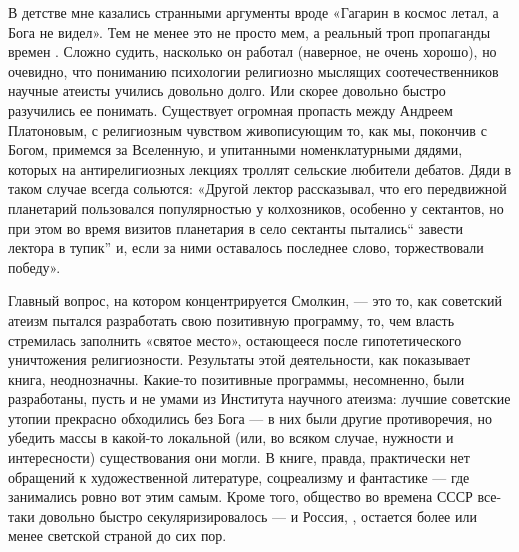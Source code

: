 В детстве мне казались странными аргументы вроде
«Гагарин в космос летал, а Бога не видел».
Тем не менее это не просто мем, а реальный троп пропаганды
времен .
Сложно судить, насколько он работал (наверное, не очень хорошо), но очевидно,
что пониманию психологии религиозно мыслящих соотечественников научные
атеисты учились довольно долго.
Или скорее довольно быстро разучились ее понимать.
Существует огромная пропасть между Андреем Платоновым,
с религиозным чувством живописующим то, как мы,
покончив с Богом, примемся за Вселенную, и упитанными номенклатурными дядями,
которых на антирелигиозных лекциях троллят сельские любители дебатов.
Дяди в таком случае всегда сольются:
«Другой лектор рассказывал, что его передвижной планетарий пользовался
популярностью у колхозников, особенно у сектантов, но при этом во время
визитов планетария в село сектанты пытались`` завести лектора в тупик''
и, если за ними оставалось последнее слово, торжествовали победу».

Главный вопрос, на котором концентрируется Смолкин,
--- это то, как советский атеизм пытался разработать свою позитивную программу,
то, чем власть стремилась заполнить  «святое место»,
остающееся после гипотетического уничтожения религиозности.
Результаты этой деятельности, как показывает книга, неоднозначны.
Какие-то позитивные программы, несомненно, были разработаны,
пусть и не умами из Института научного атеизма:
лучшие советские утопии прекрасно обходились без Бога ---
в них были другие противоречия, но убедить массы в какой-то локальной
 (или, во всяком случае,
нужности и интересности) существования они могли.
В книге, правда, практически нет обращений к художественной литературе,
соцреализму и фантастике --- где занимались ровно вот этим самым.
Кроме того, общество во времена СССР все-таки довольно быстро секуляризировалось
--- и Россия, ,
остается более или менее светской страной до сих пор.

